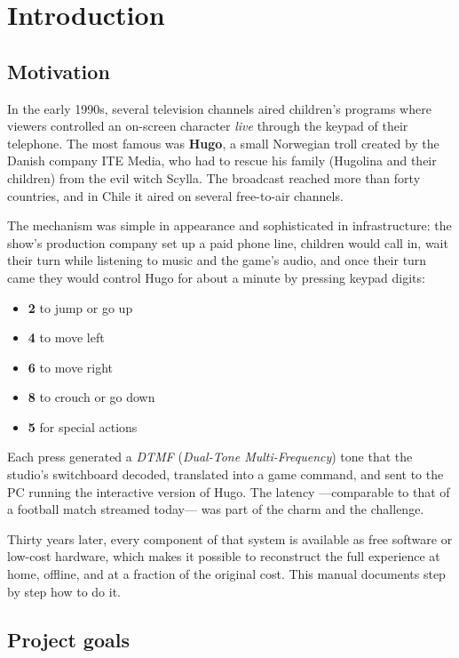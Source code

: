 \chapter{Introduction}

\section{Motivation}

In the early 1990s, several television channels aired children's programs where viewers controlled an on-screen character \emph{live} through the keypad of their telephone. The most famous was \textbf{Hugo}, a small Norwegian troll created by the Danish company ITE Media, who had to rescue his family (Hugolina and their children) from the evil witch Scylla. The broadcast reached more than forty countries, and in Chile it aired on several free-to-air channels.

The mechanism was simple in appearance and sophisticated in infrastructure: the show's production company set up a paid phone line, children would call in, wait their turn while listening to music and the game's audio, and once their turn came they would control Hugo for about a minute by pressing keypad digits:

\begin{itemize}
  \item \textbf{2} to jump or go up
  \item \textbf{4} to move left
  \item \textbf{6} to move right
  \item \textbf{8} to crouch or go down
  \item \textbf{5} for special actions
\end{itemize}

Each press generated a \emph{DTMF} (\emph{Dual-Tone Multi-Frequency}) tone that the studio's switchboard decoded, translated into a game command, and sent to the PC running the interactive version of Hugo. The latency ---comparable to that of a football match streamed today--- was part of the charm and the challenge.

Thirty years later, every component of that system is available as free software or low-cost hardware, which makes it possible to reconstruct the full experience at home, offline, and at a fraction of the original cost. This manual documents step by step how to do it.

\section{Project goals}

